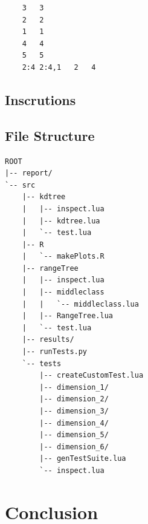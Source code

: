 \documentclass{article}
\begin{document}
  \begin{lstlisting}
  	3	3
  	2	2
  	1	1
  	4	4
  	5	5
	2:4	2:4,1	2	4
  \end{lstlisting}
  
  \subsection{Inscrutions}
\subsection{File Structure}
\begin{verbatim}
ROOT
|-- report/
`-- src
    |-- kdtree
    |   |-- inspect.lua
    |   |-- kdtree.lua
    |   `-- test.lua
    |-- R
    |   `-- makePlots.R
    |-- rangeTree
    |   |-- inspect.lua
    |   |-- middleclass
    |   |   `-- middleclass.lua
    |   |-- RangeTree.lua
    |   `-- test.lua
    |-- results/
    |-- runTests.py
    `-- tests
        |-- createCustomTest.lua
        |-- dimension_1/
        |-- dimension_2/
        |-- dimension_3/
        |-- dimension_4/
        |-- dimension_5/
        |-- dimension_6/
        |-- genTestSuite.lua
        `-- inspect.lua
\end{verbatim}

\section{Conclusion}
\end{document}
